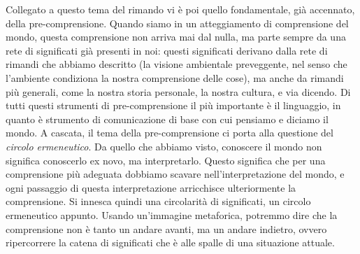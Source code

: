 \documentclass[a4paper,12pt,oneside]{article}%
\begin{document}
Collegato a questo tema del rimando vi è poi quello fondamentale, già accennato, della pre-comprensione. Quando siamo in un atteggiamento di comprensione del mondo, questa comprensione non arriva mai dal nulla, ma parte sempre da una rete di significati già presenti in noi: questi significati derivano dalla rete di rimandi che abbiamo descritto (la visione ambientale preveggente, nel senso che l’ambiente condiziona la nostra comprensione delle cose), ma anche da rimandi più generali, come la nostra storia personale, la nostra cultura, e via dicendo. Di tutti questi strumenti di pre-comprensione il più importante è il linguaggio, in quanto è strumento di comunicazione di base con cui pensiamo e diciamo il mondo. A cascata,  il tema della pre-comprensione ci porta alla questione del \textit{circolo ermeneutico}. Da quello che abbiamo visto, conoscere il mondo non significa conoscerlo ex novo, ma interpretarlo. Questo significa che per una comprensione più adeguata dobbiamo scavare nell’interpretazione del mondo, e ogni passaggio di questa interpretazione arricchisce ulteriormente la comprensione. Si innesca quindi una circolarità di significati, un circolo ermeneutico appunto. Usando un’immagine metaforica, potremmo dire che la comprensione non è tanto un andare avanti, ma un andare indietro, ovvero ripercorrere la catena di significati che è alle spalle di una situazione attuale.
\end{document}
